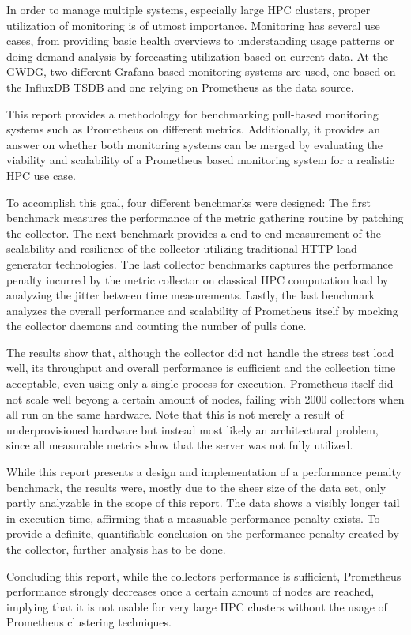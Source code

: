 In order to manage multiple systems, especially large \ac{HPC} clusters, proper utilization of monitoring is of utmost importance.
Monitoring has several use cases, from providing basic health overviews to understanding usage patterns or doing demand analysis by forecasting utilization based on current data.
At the GWDG, two different Grafana based monitoring systems are used, one based on the InfluxDB \ac{TSDB} and one relying on Prometheus as the data source.

This report provides a methodology for benchmarking pull-based monitoring systems such as Prometheus on different metrics. Additionally, it provides an answer on whether both monitoring systems can be merged by evaluating the viability and scalability of a Prometheus based monitoring system for a realistic \ac{HPC} use case.

To accomplish this goal, four different benchmarks were designed: The first benchmark measures the performance of the metric gathering routine by patching the collector. The next benchmark provides a end to end measurement of the scalability and resilience of the collector utilizing traditional HTTP load generator technologies. The last collector benchmarks captures the performance penalty incurred by the metric collector on classical HPC computation load by analyzing the jitter between time measurements. Lastly, the last benchmark analyzes the overall performance and scalability of Prometheus itself by mocking the collector daemons and counting the number of pulls done.

The results show that, although the collector did not handle the stress test load well, its throughput and overall performance is cufficient and the collection time acceptable, even using only a single process for execution. Prometheus itself did not scale well beyong a certain amount of nodes, failing with 2000 collectors when all run on the same hardware. Note that this is not merely a result of underprovisioned hardware but instead most likely an architectural problem, since all measurable metrics show that the server was not fully utilized.

While this report presents a design and implementation of a performance penalty benchmark, the results were, mostly due to the sheer size of the data set, only partly analyzable in the scope of this report. The data shows a visibly longer tail in execution time, affirming that a measuable performance penalty exists. To provide a definite, quantifiable conclusion on the performance penalty created by the collector, further analysis has to be done.

Concluding this report, while the collectors performance is sufficient, Prometheus performance strongly decreases once a certain amount of nodes are reached, implying that it is not usable for very large \ac{HPC} clusters without the usage of Prometheus clustering techniques.

